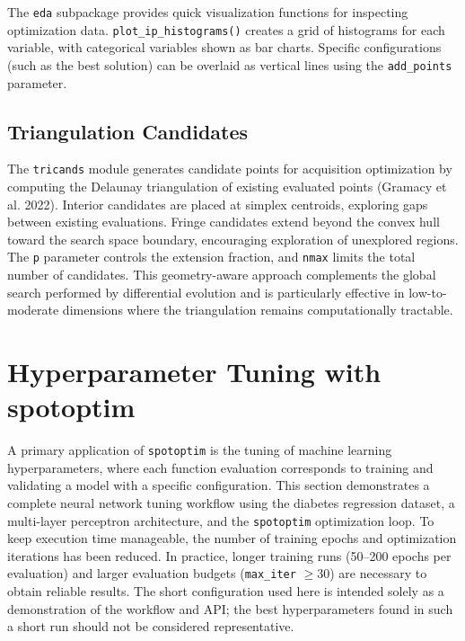 \documentclass[
  twocolumn]{article}
\begin{document}
The \texttt{eda} subpackage provides quick visualization functions for
inspecting optimization data. \texttt{plot\_ip\_histograms()} creates a
grid of histograms for each variable, with categorical variables shown
as bar charts. Specific configurations (such as the best solution) can
be overlaid as vertical lines using the \texttt{add\_points} parameter.

\subsection{Triangulation Candidates}\label{sec-tricands}

The \texttt{tricands} module generates candidate points for acquisition
optimization by computing the Delaunay triangulation of existing
evaluated points (Gramacy et al. 2022). Interior candidates are placed
at simplex centroids, exploring gaps between existing evaluations.
Fringe candidates extend beyond the convex hull toward the search space
boundary, encouraging exploration of unexplored regions. The \texttt{p}
parameter controls the extension fraction, and \texttt{nmax} limits the
total number of candidates. This geometry-aware approach complements the
global search performed by differential evolution and is particularly
effective in low-to-moderate dimensions where the triangulation remains
computationally tractable.

\section{Hyperparameter Tuning with spotoptim}\label{sec-hpt}

A primary application of \texttt{spotoptim} is the tuning of machine
learning hyperparameters, where each function evaluation corresponds to
training and validating a model with a specific configuration. This
section demonstrates a complete neural network tuning workflow using the
diabetes regression dataset, a multi-layer perceptron architecture, and
the \texttt{spotoptim} optimization loop. To keep execution time
manageable, the number of training epochs and optimization iterations
has been reduced. In practice, longer training runs (50--200 epochs per
evaluation) and larger evaluation budgets (\texttt{max\_iter}
\(\geq 30\)) are necessary to obtain reliable results. The short
configuration used here is intended solely as a demonstration of the
workflow and API; the best hyperparameters found in such a short run
should not be considered representative.
\end{document}
